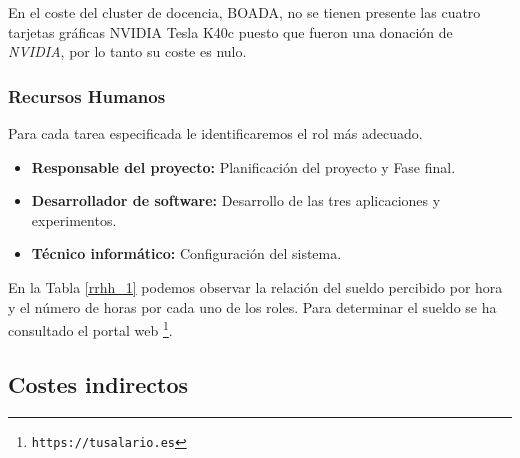 \documentclass[titlepage,12pt]{report}
\begin{document}
En el coste del cluster de docencia, BOADA, no se tienen presente las cuatro tarjetas gráficas NVIDIA Tesla K40c puesto que fueron una donación de \textit{NVIDIA}, por lo tanto su coste es nulo.

\subsubsection{Recursos Humanos}


Para cada tarea especificada le identificaremos el rol más adecuado. 
\begin{itemize}
	\item \textbf{Responsable del proyecto:} Planificación del proyecto y Fase final.
	\item \textbf{Desarrollador de software:} Desarrollo de las tres aplicaciones y experimentos.
	\item \textbf{Técnico informático:} Configuración del sistema.
\end{itemize}

\begin{table}[H]
	\centering
	\caption{Coste recursos de RRHH}
	\label{rrhh_1}
\end{table}

En la Tabla \ref{rrhh_1} podemos observar la relación del sueldo percibido por hora y el número de horas por cada uno de los roles. Para determinar el sueldo se ha consultado el portal web \footnote{\texttt{https://tusalario.es}}.

\subsection{Costes indirectos}
\end{document}
